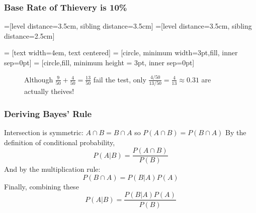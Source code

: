 \begin{frame}
\frametitle{Base Rate of Thievery is 10\%}

=[level distance=3.5cm, sibling distance=3.5cm]
=[level distance=3.5cm, sibling distance=2.5cm]

 = [text width=4em, text centered]
 = [circle, minimum width=3pt,fill, inner sep=0pt]
 = [circle,fill, minimum height = 3pt, inner sep=0pt]
\begin{figure}
\centering
{}
\caption{Although $\frac{9}{50} + \frac{4}{50} = \frac{13}{50}$ fail the test, only $\frac{4/50}{13/50} = \frac{4}{13} \approx 0.31$ are actually theives!}
\end{figure}


\end{frame}
\begin{frame}
\frametitle{Deriving Bayes' Rule}
Intersection is symmetric: $A\cap B = B\cap A$ so $P(A\cap B) = P(B \cap A)$ \pause  By the definition of conditional probability,
	$$P(A|B) = \frac{P(A\cap B)}{P(B)}$$ \pause
And by the multiplication rule:
	$$P(B\cap A) = P(B|A)P(A)$$ \pause
Finally, combining these
	$$P(A|B) = \frac{P(B|A)P(A)}{P(B)}$$
\end{frame}
